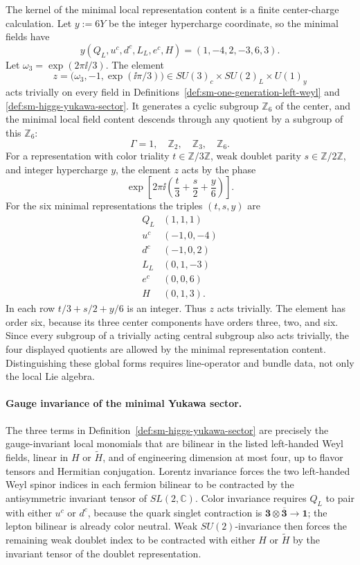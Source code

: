 The kernel of the minimal local representation content is a finite
center-charge calculation.  Let \(y:=6Y\) be the integer hypercharge
coordinate, so the minimal fields
have
\[
  y(Q_L,u^c,d^c,L_L,e^c,H)=(1,-4,2,-3,6,3).
\]
Let \(\omega_3=\exp(2\pi\ii/3)\).  The element
\begin{equation}
  z=\bigl(\omega_3,-1,\exp(\ii\pi/3)\bigr)
  \in SU(3)_c\times SU(2)_L\times U(1)_y
  \label{eq:sm-zsix-generator}
\end{equation}
acts trivially on every field in
Definitions~\ref{def:sm-one-generation-left-weyl} and
\ref{def:sm-higgs-yukawa-sector}.  It generates a cyclic subgroup
\(\mathbb Z_6\) of the center, and the minimal local field content descends
through any quotient by a subgroup of this \(\mathbb Z_6\):
\[
  \Gamma=1,\quad \mathbb Z_2,\quad \mathbb Z_3,\quad \mathbb Z_6 .
\]
For a representation with color triality \(t\in\mathbb Z/3\mathbb Z\), weak
doublet parity \(s\in\mathbb Z/2\mathbb Z\), and integer hypercharge \(y\),
the element \(z\) acts by the phase
\[
  \exp\!\left[
    2\pi\ii\left(\frac{t}{3}+\frac{s}{2}+\frac{y}{6}\right)
  \right].
\]
For the six minimal representations the triples \((t,s,y)\) are
\[
\begin{array}{c|c}
  Q_L & (1,1,1)\\
  u^c & (-1,0,-4)\\
  d^c & (-1,0,2)\\
  L_L & (0,1,-3)\\
  e^c & (0,0,6)\\
  H & (0,1,3).
\end{array}
\]
In each row \(t/3+s/2+y/6\) is an integer.  Thus \(z\) acts trivially.
The element has order six, because its three center components have orders
three, two, and six.  Since every subgroup of a trivially acting central
subgroup also acts trivially, the four displayed quotients are allowed by the
minimal representation content.  Distinguishing these global forms requires
line-operator and bundle data, not only the local Lie algebra.

\paragraph{Gauge invariance of the minimal Yukawa sector.}
The three terms in Definition~\ref{def:sm-higgs-yukawa-sector} are precisely
the gauge-invariant local monomials that are bilinear in the listed
left-handed Weyl fields, linear in \(H\) or \(\widetilde H\), and of
engineering dimension at most four, up to flavor tensors and Hermitian
conjugation.
Lorentz invariance forces the two left-handed Weyl spinor indices in each
fermion bilinear to be contracted by the antisymmetric invariant tensor of
\(SL(2,\mathbb C)\).  Color invariance requires \(Q_L\) to pair with either
\(u^c\) or \(d^c\), because the quark singlet contraction is
\(\mathbf3\otimes\overline{\mathbf3}\to\mathbf1\); the lepton bilinear is
already color neutral.  Weak \(SU(2)\)-invariance then forces the remaining
weak doublet index to be contracted with either \(H\) or \(\widetilde H\) by
the invariant tensor of the doublet representation.


